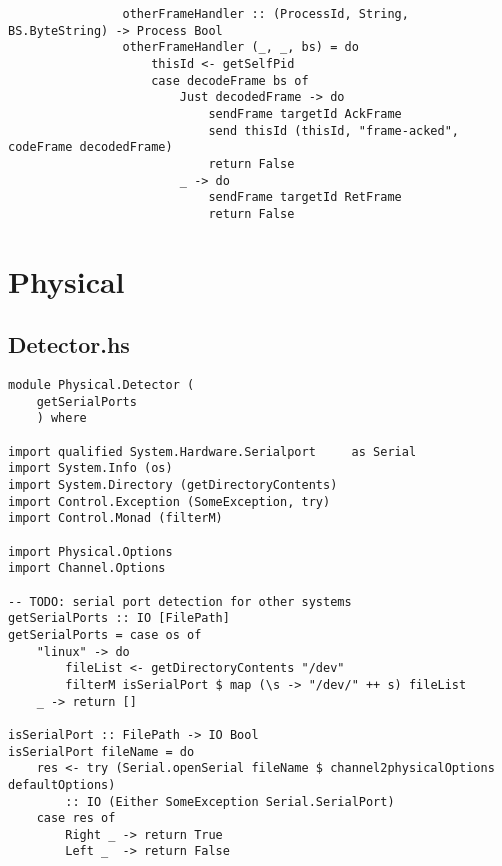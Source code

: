 \documentclass[russian,utf8,simple,emptystyle]{eskdtext}
\begin{document}
\begin{lstlisting}
                otherFrameHandler :: (ProcessId, String, BS.ByteString) -> Process Bool
                otherFrameHandler (_, _, bs) = do
                    thisId <- getSelfPid
                    case decodeFrame bs of 
                        Just decodedFrame -> do 
                            sendFrame targetId AckFrame
                            send thisId (thisId, "frame-acked", codeFrame decodedFrame)
                            return False
                        _ -> do
                            sendFrame targetId RetFrame
                            return False
\end{lstlisting}

\section{Physical}
\subsection{Detector.hs}
\begin{lstlisting}
module Physical.Detector (
    getSerialPorts
    ) where

import qualified System.Hardware.Serialport     as Serial
import System.Info (os)
import System.Directory (getDirectoryContents)
import Control.Exception (SomeException, try)
import Control.Monad (filterM)

import Physical.Options
import Channel.Options 

-- TODO: serial port detection for other systems
getSerialPorts :: IO [FilePath]
getSerialPorts = case os of 
    "linux" -> do 
        fileList <- getDirectoryContents "/dev"
        filterM isSerialPort $ map (\s -> "/dev/" ++ s) fileList
    _ -> return []

isSerialPort :: FilePath -> IO Bool
isSerialPort fileName = do 
    res <- try (Serial.openSerial fileName $ channel2physicalOptions defaultOptions)
        :: IO (Either SomeException Serial.SerialPort)
    case res of 
        Right _ -> return True
        Left _  -> return False
\end{lstlisting}
\end{document}

